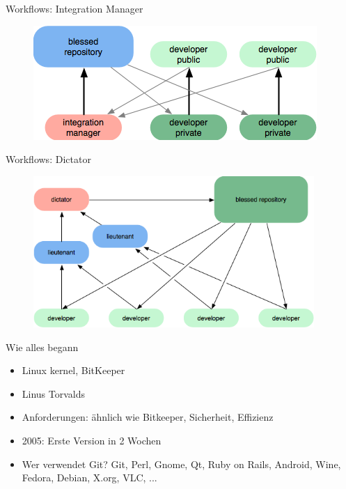 \documentclass{beamer}
\begin{document}
\begin{frame}{Workflows: Integration Manager}
 
  \begin{figure}
     \includegraphics[scale=1.0]{./images/workflow-integration-manager.png}
  \end{figure}

\end{frame}

\begin{frame}{Workflows: Dictator}
 
  \begin{figure}
     \includegraphics[width=0.95\textwidth]{./images/workflow-dictator.png}
  \end{figure}

\end{frame}


\begin{frame}[<+->]{Wie alles begann}{}
  \begin{itemize}
    \item Linux kernel, BitKeeper
    \item Linus Torvalds
    \item Anforderungen: ähnlich wie Bitkeeper, Sicherheit, Effizienz
    \item 2005: Erste Version in 2 Wochen
    \item Wer verwendet Git? Git, Perl, Gnome, Qt, Ruby on Rails, Android, Wine, Fedora, Debian, X.org, VLC, ...

  \end{itemize}
\end{frame}
\end{document}
